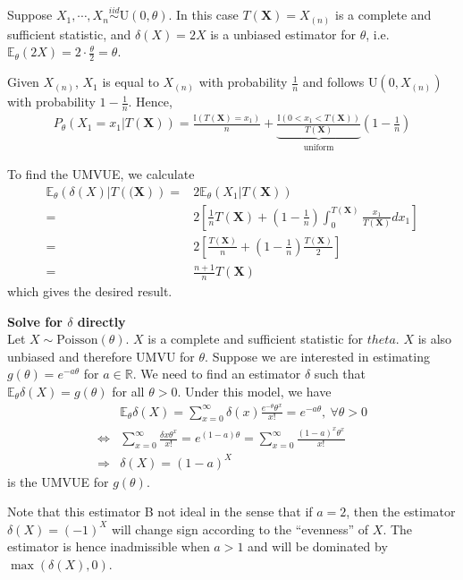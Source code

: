 \begin{example}
    Suppose $X_1,\cdots,X_n\overset{iid}{\sim}\text{U}(0,\theta)$.
    In this case $T(\boldsymbol{X})=X_{(n)}$ is a complete and sufficient statistic,
    and $\delta(X)=2X$ is a unbiased estimator for $\theta$, 
    i.e. $\mathbb{E}_\theta(2X)=2\cdot\frac{\theta}{2}=\theta$.

    Given $X_{(n)}$, $X_1$ is equal to $X_{(n)}$ with probability $\frac{1}{n}$
    and follows $\text{U}(0,X_{(n)})$ with probability $1-\frac{1}{n}$.
    Hence,
    \begin{gather}
        P_\theta(X_1=x_1|T(\boldsymbol{X}))
        =\frac{\mathbb{I}(T(\boldsymbol{X})=x_1)}{n}
        +\underbrace{\frac{\mathbb{I}(0<x_1<T(\boldsymbol{X}))}{T(\boldsymbol{X})}}_{\text{uniform}}(1-\frac{1}{n})
    \end{gather}

    To find the UMVUE, we calculate 
    \begin{align}
        \mathbb{E}_\theta(\delta(X)|T(\boldsymbol{(X}))
        =& 2\mathbb{E}_\theta(X_1|T(\boldsymbol{X}))\\
        =& 2\left[ \frac{1}{n}T(\boldsymbol{X}) + (1-\frac{1}{n})\int_{0}^{T(\boldsymbol{X})}\frac{x_1}{T(\boldsymbol{X})}dx_1 \right]\\
        =& 2\left[ \frac{T(\boldsymbol{X})}{n} + (1-\frac{1}{n})\frac{T(\boldsymbol{X})}{2} \right]\\
        =& \frac{n+1}{n}T(\boldsymbol{X})
    \end{align}
    which gives the desired result.
\end{example}

\begin{example}
    \textbf{Solve for $\delta$ directly}\\
    Let $X\sim\text{Poisson}(\theta)$. 
    $X$ is a complete and sufficient statistic for $theta$.
    $X$ is also unbiased and therefore UMVU for $\theta$.
    Suppose we are interested in estimating $g(\theta)=e^{-a\theta}$ for $a\in\mathbb{R}$.
    We need to find an estimator $\delta$ such that $\mathbb{E}_\theta\delta(X)=g(\theta)$ for all $\theta>0$.
    Under this model, we have
    \begin{align}
        &\mathbb{E}_\theta\delta(X)=\sum_{x=0}^\infty\delta(x)\frac{e^{-\theta}\theta^x}{x!}=e^{-a\theta},~\forall{\theta}>0\\
        \Leftrightarrow& \sum_{x=0}^\infty\frac{\delta{x}\theta^x}{x!}=e^{(1-a)\theta}=\sum_{x=0}^\infty\frac{(1-a)^x\theta^x}{x!}\\
        \Rightarrow& \delta(X)=(1-a)^X
    \end{align}
    is the UMVUE for $g(\theta)$.

    Note that this estimator B not ideal in the sense that if $a = 2$,
    then the estimator $\delta(X) = (-1)^X$ will change sign according to
    the ``evenness'' of $X$. 
    The estimator is hence inadmissible when $a > 1$ and will be
    dominated by $\max(\delta(X),0)$.
\end{example}

